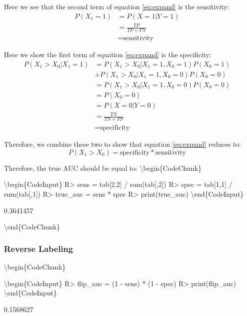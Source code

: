 \documentclass[article]{jss}
\begin{document}
Here we see that the second term of equation \eqref{eq:expand} is the
sensitivity: \begin{align*}
P(X_{1} = 1) &= P(X = 1 | Y = 1)\\
&= \frac{TP}{TP + FN} \\
&= \text{sensitivity}
\end{align*}

Here we show the first term of equation \eqref{eq:expand} is the
specificity: \begin{align*}
P(X_{1} > X_{0} | X_{1} = 1) &= P(X_{1} > X_{0} | X_{1} = 1, X_{0} =1) P(X_{0} = 1) \\
&+ P(X_{1} > X_{0} | X_{1} = 1, X_{0} =0) P(X_{0} = 0) \\
&= P(X_{1} > X_{0} | X_{1} = 1, X_{0} =0) P(X_{0} = 0) \\
&= P(X_{0} = 0) \\
&= P(X = 0 | Y = 0)\\
&= \frac{TN}{TN + FP} \\
&= \text{specificity}
\end{align*}

Therefore, we combine these two to show that equation \eqref{eq:expand}
reduces to: \[
P(X_{1} > X_{0}) = \text{specificity} * \text{sensitivity}
\]

Therefore, the true AUC should be equal to:
\textbackslash{}begin\{CodeChunk\}

\textbackslash{}begin\{CodeInput\} R\textgreater{} sens = tab{[}2,2{]} /
sum(tab{[},2{]}) R\textgreater{} spec = tab{[}1,1{]} / sum(tab{[},1{]})
R\textgreater{} true\_auc = sens * spec R\textgreater{} print(true\_auc)
\textbackslash{}end\{CodeInput\}

\begin{CodeOutput}
[1] 0.3641457
\end{CodeOutput}

\textbackslash{}end\{CodeChunk\}

\hypertarget{reverse-labeling}{%
\subsubsection{Reverse Labeling}\label{reverse-labeling}}

\textbackslash{}begin\{CodeChunk\}

\textbackslash{}begin\{CodeInput\} R\textgreater{} flip\_auc = (1 -
sens) * (1 - spec) R\textgreater{} print(flip\_auc)
\textbackslash{}end\{CodeInput\}

\begin{CodeOutput}
[1] 0.1568627
\end{CodeOutput}
\end{document}
